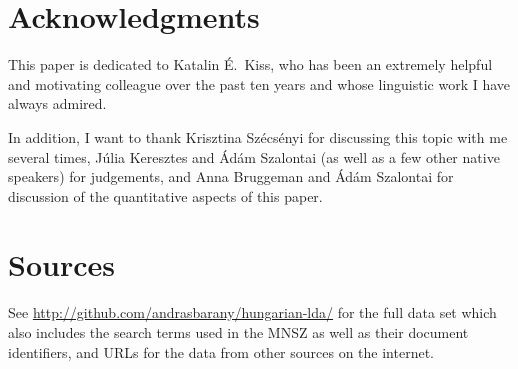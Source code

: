 \section*{Acknowledgments}

This paper is dedicated to Katalin É.\ Kiss, who has been an extremely helpful
and motivating colleague over the past ten years and whose linguistic work I
have always admired.

In addition, I want to thank Krisztina Szécsényi for discussing this topic with
me several times, Júlia Keresztes and Ádám Szalontai (as well as a few other
native speakers) for judgements, and Anna Bruggeman and Ádám Szalontai for
discussion of the quantitative aspects of this paper.

\newrefcontext[sorting=nyt]
\printbibliography

\appendix

\section{Sources}\label{app:sources}

See \url{http://github.com/andrasbarany/hungarian-lda/} for the full data set
which also includes the search terms used in the \gls{MNSZ} as well as their
document identifiers, and URLs for the data from other sources on the internet.

